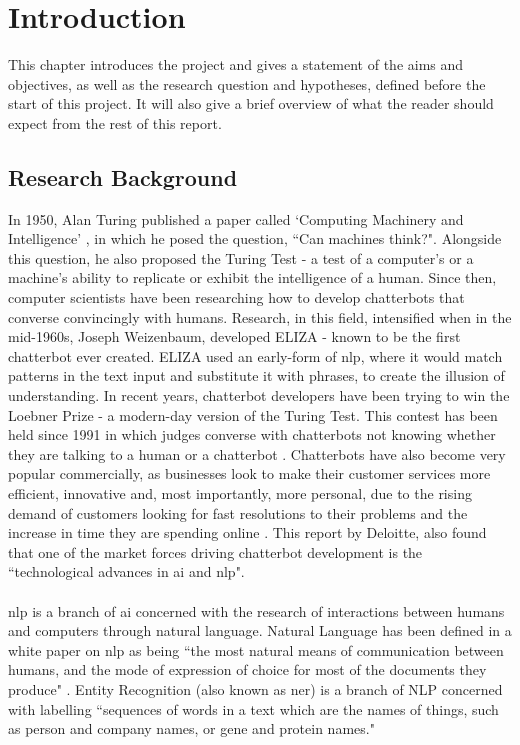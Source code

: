 \chapter{Introduction}
This chapter introduces the project and gives a statement of the aims and objectives, as well as the research question and hypotheses, defined before the start of this project. It will also give a brief overview of what the reader should expect from the rest of this report.

\section{Research Background}
In 1950, Alan Turing published a paper called `Computing Machinery and Intelligence' \autocite{turing-paper1950}, in which he posed the question, ``Can machines think?". Alongside this question, he also proposed the Turing Test - a test of a computer's or a machine's ability to replicate or exhibit the intelligence of a human. Since then, computer scientists have been researching how to develop chatterbots that converse convincingly with humans. Research, in this field, intensified when in the mid-1960s, Joseph Weizenbaum, developed ELIZA \autocite{weizenbaum-eliza1966} - known to be the first chatterbot ever created. ELIZA used an early-form of \gls{nlp}, where it would match patterns in the text input and substitute it with phrases, to create the illusion of understanding. In recent years, chatterbot developers have been trying to win the Loebner Prize - a modern-day version of the Turing Test. This contest has been held since 1991 in which judges converse with chatterbots not knowing whether they are talking to a human or a chatterbot \autocite{loebner-prize2001}. Chatterbots have also become very popular commercially, as businesses look to make their customer services more efficient, innovative and, most importantly, more personal, due to the rising demand of customers looking for fast resolutions to their problems and the increase in time they are spending online \autocite{deloitte-chatbots2018}. This report by Deloitte, also found that one of the market forces driving chatterbot development is the ``technological advances in \gls{ai} and \gls{nlp}".\\\\
\gls{nlp} is a branch of \gls{ai} concerned with the research of interactions between humans and computers through natural language. Natural Language has been defined in a white paper on \gls{nlp} as being ``the most natural means of communication between humans, and the mode of expression of choice for most of the documents they produce" \autocite{nlp-whitepaper1989}. Entity Recognition (also known as \gls{ner}) is a branch of NLP concerned with labelling ``sequences of words in a text which are the names of things, such as person and company names, or gene and protein names."  \autocite{stanford-nlp-group-ner}\\\\
